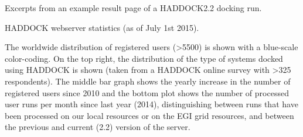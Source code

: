 \caption{Excerpts from an example result page of a HADDOCK2.2 docking run.}
{}
\stopbuffer


\caption{HADDOCK webserver statistics (as of July 1st 2015).}
{The worldwide distribution of registered users (>5500) is shown with a
blue-scale color-coding. On the top right, the distribution of the type of
systems docked using HADDOCK is shown (taken from a HADDOCK online survey with
>325 respondents). The middle bar graph shows the yearly increase in the number
of registered users since 2010 and the bottom plot shows the number of
processed user runs per month since last year (2014), distinguishing between
runs that have been processed on our local resources or on the EGI grid
resources, and between the previous and current (2.2) version of the server.}
\stopbuffer
